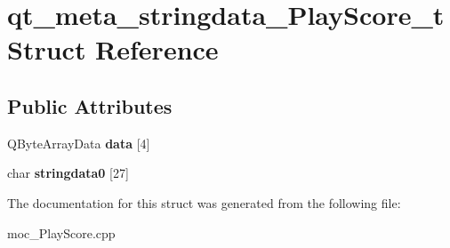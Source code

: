 \hypertarget{structqt__meta__stringdata__PlayScore__t}{}\section{qt\+\_\+meta\+\_\+stringdata\+\_\+\+Play\+Score\+\_\+t Struct Reference}
\label{structqt__meta__stringdata__PlayScore__t}
\subsection*{Public Attributes}
\begin{DoxyCompactItemize}
\item 
Q\+Byte\+Array\+Data {\bfseries data} \mbox{[}4\mbox{]}\hypertarget{structqt__meta__stringdata__PlayScore__t_ae2d50b695793cc028b52a4b0b3b1f1ee}{}\label{structqt__meta__stringdata__PlayScore__t_ae2d50b695793cc028b52a4b0b3b1f1ee}

\item 
char {\bfseries stringdata0} \mbox{[}27\mbox{]}\hypertarget{structqt__meta__stringdata__PlayScore__t_a7412258a721c8d414d3cb4ba64e5149a}{}\label{structqt__meta__stringdata__PlayScore__t_a7412258a721c8d414d3cb4ba64e5149a}

\end{DoxyCompactItemize}


The documentation for this struct was generated from the following file\+:\begin{DoxyCompactItemize}
\item 
moc\+\_\+\+Play\+Score.\+cpp\end{DoxyCompactItemize}

